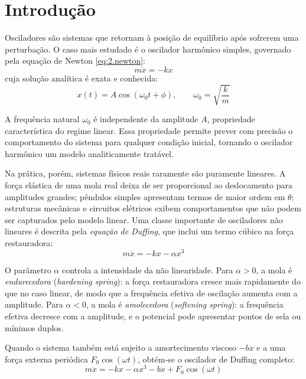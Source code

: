 \section{Introdução}
\label{sec:introducao}

Osciladores são sistemas que retornam à posição de equilíbrio após sofrerem uma perturbação. O caso mais estudado é o oscilador harmônico simples, governado pela equação de Newton \ref{eq:2.newton}:
\begin{equation}
    \label{eq:2.newton}
    m\ddot{x} = -kx
\end{equation}
cuja solução analítica é exata e conhecida:
\begin{equation}
    x(t) = A\cos(\omega_0 t + \phi), \qquad \omega_0 = \sqrt{\frac{k}{m}}
\end{equation}

A frequência natural $\omega_0$ é independente da amplitude $A$, propriedade característica do regime linear. Essa propriedade permite prever com precisão o comportamento do sistema para qualquer condição inicial, tornando o oscilador harmônico um modelo analiticamente tratável.

Na prática, porém, sistemas físicos reais raramente são puramente lineares. A força elástica de uma mola real deixa de ser proporcional ao deslocamento para amplitudes grandes; pêndulos simples apresentam termos de maior ordem em $\theta$; estruturas mecânicas e circuitos elétricos exibem comportamentos que não podem ser capturados pelo modelo linear. Uma classe importante de osciladores não lineares é descrita pela \emph{equação de Duffing}, que inclui um termo cúbico na força restauradora:
\begin{equation}
    \label{eq:duffing}
    m\ddot{x} = -kx - \alpha x^3
\end{equation}

O parâmetro $\alpha$ controla a intensidade da não linearidade. Para $\alpha > 0$, a mola é \emph{endurecedora} (\textit{hardening spring}): a força restauradora cresce mais rapidamente do que no caso linear, de modo que a frequência efetiva de oscilação aumenta com a amplitude. Para $\alpha < 0$, a mola é \emph{amolecedora} (\textit{softening spring}): a frequência efetiva decresce com a amplitude, e o potencial pode apresentar pontos de sela ou mínimos duplos.

Quando o sistema também está sujeito a amortecimento viscoso $-b\dot{x}$ e a uma força externa periódica $F_0\cos(\omega t)$, obtém-se o oscilador de Duffing completo:
\begin{equation}
    \label{eq:duffing-completo}
    m\ddot{x} = -kx - \alpha x^3 - b\dot{x} + F_0\cos(\omega t)
\end{equation}

